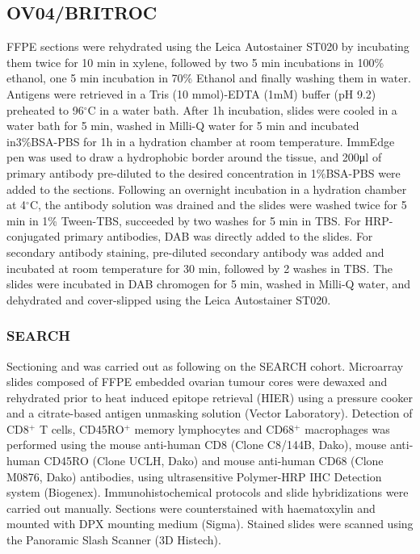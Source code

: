 \subsection{OV04/BRITROC}\label{sec:sarwah_staining}
FFPE sections were rehydrated using the Leica Autostainer ST020 by incubating them twice for 10 min in xylene, followed by two 5 min incubations in 100\% ethanol, one 5 min incubation in 70\% Ethanol and finally washing them in water. Antigens were retrieved in a Tris (10 mmol)-EDTA (1mM) buffer (pH 9.2) preheated to 96${^\circ}$C in a water bath. After 1h incubation, slides were cooled in a water bath for 5 min, washed in Milli-Q water for 5 min and incubated in3\%BSA-PBS for 1h in a hydration chamber at room temperature. ImmEdge pen was used to draw a hydrophobic border around the tissue, and 200μl of primary antibody pre-diluted to the desired concentration in 1\%BSA-PBS were added to the sections. Following an overnight incubation in a hydration chamber at 4$^{\circ}$C, the antibody solution was drained and the slides were washed twice for 5 min in 1\% Tween-TBS, succeeded by two washes for 5 min in TBS. For HRP-conjugated primary antibodies, DAB was directly added to the slides. For secondary antibody staining, pre-diluted secondary antibody was added and incubated at room temperature for 30 min, followed by 2 washes in TBS. The slides were incubated in DAB chromogen for
5 min, washed in Milli-Q water, and dehydrated and cover-slipped using the Leica Autostainer ST020.

\subsubsection{SEARCH}
Sectioning and was carried out as following on the SEARCH cohort. Microarray slides composed of FFPE embedded ovarian tumour cores were dewaxed and rehydrated prior to heat induced epitope retrieval (HIER) using a pressure cooker and a citrate-based antigen unmasking solution (Vector Laboratory). Detection of CD8$^+$ T cells, CD45RO$^+$ memory lymphocytes and CD68$^+$ macrophages was performed using the mouse anti-human CD8 (Clone C8/144B, Dako), mouse anti-human CD45RO (Clone UCLH, Dako) and mouse anti-human CD68 (Clone M0876, Dako) antibodies, using ultrasensitive Polymer-HRP IHC Detection system (Biogenex). Immunohistochemical protocols and slide hybridizations were carried out manually. Sections were counterstained with haematoxylin and mounted with DPX mounting medium (Sigma). Stained slides were scanned using the Panoramic Slash Scanner (3D Histech).


